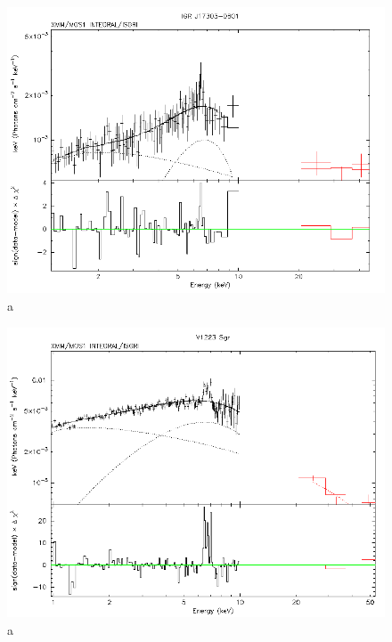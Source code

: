 \documentclass[oneside,a4paper,11pt]{report}
\begin{document}
\begin{figure}[!hbt]
\centering
\includegraphics[totalheight=8cm]{spec/5}
\caption{a}
\label{sp1} 
\end{figure}

\begin{figure}[!hbt]
\centering
\includegraphics[totalheight=8cm]{spec/6}
\caption{a}
\label{sp1} 
\end{figure}
\end{document}
